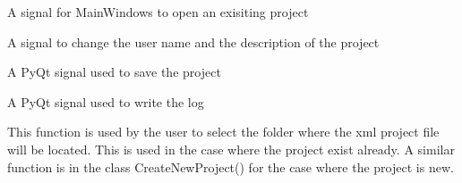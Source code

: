\documentclass[letterpaper,10pt,english]{sphinxmanual}
\begin{document}
\begin{fulllineitems}
\begin{fulllineitems}
\label{\detokenize{index:src_GUI.Main_windows_1.WelcomeW.open_proj}}
A signal for MainWindows to open an exisiting project

\end{fulllineitems}


\begin{fulllineitems}
\label{\detokenize{index:src_GUI.Main_windows_1.WelcomeW.save_info_signal}}
A signal to change the user name and the description of the project

\end{fulllineitems}


\begin{fulllineitems}
\label{\detokenize{index:src_GUI.Main_windows_1.WelcomeW.save_signal}}
A PyQt signal used to save the project

\end{fulllineitems}


\begin{fulllineitems}
\label{\detokenize{index:src_GUI.Main_windows_1.WelcomeW.send_log}}
A PyQt signal used to write the log

\end{fulllineitems}


\begin{fulllineitems}
\label{\detokenize{index:src_GUI.Main_windows_1.WelcomeW.setfolder2}}
This function is used by the user to select the folder where the xml project file will be located.
This is used in the case where the project exist already. A similar function is in the class CreateNewProject()
for the case where the project is new.

\end{fulllineitems}


\end{fulllineitems}
\end{document}
